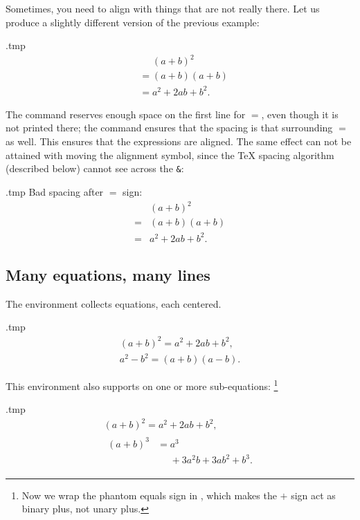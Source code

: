 Sometimes, you need to align with things that are not really there.
Let us produce a slightly different version of the previous example:
%
\begin{VerbatimOut}{\jobname.tmp}
\begin{equation}
\begin{split}
&\mathrel{\phantom{=}} (a+b)^2\\
&= (a+b)(a+b)\\
&= a^2 + 2ab + b^2.
\end{split}
\end{equation}
\end{VerbatimOut}
\ShowExample
%
The  command reserves enough space on the first line for $=$,
even though it is not printed there;
the  command ensures that the spacing is that surrounding $=$ as well.
This ensures that the expressions are aligned.
The same effect can not be attained with moving the alignment symbol,
since the \TeX{} spacing algorithm (described below) cannot see across the \verb|&|:
%
\begin{VerbatimOut}{\jobname.tmp}
Bad spacing after $=$ sign:
\begin{equation}
\begin{split}
&(a+b)^2\\
= &(a+b)(a+b)\\
= &a^2 + 2ab + b^2.
\end{split}
\end{equation}
\end{VerbatimOut}
\ShowExample



%
%
\subsection{Many equations, many lines}

The  environment collects equations, each centered.
%
\begin{VerbatimOut}{\jobname.tmp}
\begin{gather}
(a+b)^2 = a^2 + 2ab + b^2,\\
a^2 - b^2 = (a+b)(a-b).
\end{gather}
\end{VerbatimOut}
\ShowExample

This environment also supports  on one or more sub-equations:%
\footnote{Now we wrap the phantom equals sign in ,
which makes the $+$ sign act as binary plus, not unary plus.}
%
\begin{VerbatimOut}{\jobname.tmp}
\begin{gather}
(a+b)^2 = a^2 + 2ab + b^2,\\
\begin{split}
(a+b)^3 &= a^3\\
&\mathord{\phantom{=}} + 3a^2 b + 3ab^2 + b^3.
\end{split}
\end{gather}
\end{VerbatimOut}
\ShowExampleBelow

